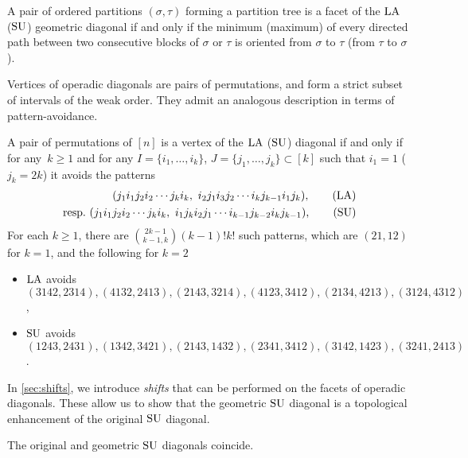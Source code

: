 \begin{theorem*}
A pair of ordered partitions $(\sigma,\tau)$ forming a partition tree is a facet of the $\mathrm{LA}$ (\resp $\mathrm{SU}$) geometric diagonal if and only if the minimum (\resp maximum) of every directed path between two consecutive blocks of $\sigma$ or $\tau$ is oriented from $\sigma$ to $\tau$ (\resp from $\tau$ to $\sigma$).
\end{theorem*}

Vertices of operadic diagonals are pairs of permutations, and form a strict subset of intervals of the weak order. 
They admit an analogous description in terms of pattern-avoidance. 

\begin{theorem*}
A pair of permutations of $[n]$ is a vertex of the $\mathrm{LA}$ (\resp $\mathrm{SU}$) diagonal if and only if for any~$k\geq 1$ and for any $I=\{i_1, \dots, i_k\}$, ${J=\{j_1, \dots, j_k\} \subset [k]}$ such that $i_1=1$ (\resp $j_k=2k$) it avoids the patterns 
\begin{align}
	(j_1 i_1 j_2 i_2 \cdots j_k i_k,\ i_2 j_1 i_3 j_2 \cdots i_k j_{k-1} i_1 j_k), \tag{LA} \\
	\text{ resp.~} (j_1 i_1 j_2 i_2 \cdots j_k i_k, \ i_1 j_k i_2 j_1 \cdots i_{k-1} j_{k-2}i_k j_{k-1}), \tag{SU}
\end{align}
For each $k \ge 1$, there are $\binom{2k-1}{k-1,k}(k-1)!k!$ such patterns, which are $(21,12)$ for $k=1$, and the following for $k=2$
\begin{itemize}
	\item $\mathrm{LA}$ avoids 
	$(3142,2314), (4132,2413),
	(2143,3214), (4123,3412),
	(2134,4213), (3124,4312)$,
	\item $\mathrm{SU}$ avoids 
	$(1243,2431),(1342,3421),
	(2143,1432),(2341,3412),
	(3142,1423),(3241,2413)$.
\end{itemize}
\end{theorem*}

In \cref{sec:shifts}, we introduce \emph{shifts} that can be performed on the facets of operadic diagonals.
These allow us to show that the geometric $\mathrm{SU}$ diagonal is a topological enhancement of the original $\mathrm{SU}$ diagonal. 

\begin{theorem*}
The original and geometric $\mathrm{SU}$ diagonals coincide. 
\end{theorem*}

